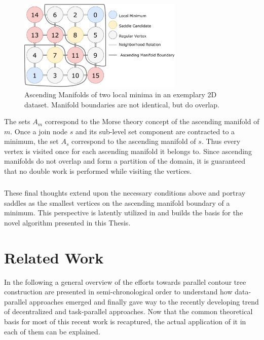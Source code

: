 \documentclass[%
	paper=A4,					%
	twoside=true,				%
	openright,					%
	parskip=full,				%
	chapterprefix=true,			%
	11pt,						%
	headings=normal,			%
	bibliography=totoc,			%
	listof=totoc,				%
	titlepage=on,				%
	captions=tableabove,		%
	draft=false,				%
]{scrreprt}%
\begin{document}
\begin{figure}[h!]
\centering
\includegraphics[width=0.7\textwidth]{figures/AscendingManifold.pdf}
\caption{Ascending Manifolds of two local minima in an exemplary 2D dataset. Manifold boundaries are not identical, but do overlap.}
\label{fig:am}
\end{figure}
  
The sets \(A_m\) correspond to the Morse theory concept of the ascending manifold of \(m\). Once a join node \(s\) and its sub-level set component are contracted to a minimum, the set \(A_s\) correspond to the ascending manifold of \(s\). Thus every vertex is visited once for each ascending manifold it belongs to. Since ascending manifolds do not overlap and form a partition of the domain, it is guaranteed that no double work is performed while visiting the vertices.

\paragraph{}
These final thoughts extend upon the necessary conditions above and portray saddles as the smallest vertices on the ascending manifold boundary of a minimum. This perspective is latently utilized in \cite{Carr} and builds the basis for the novel algorithm presented in this Thesis.

\chapter{Related Work}
In the following a general overview of the efforts towards parallel contour tree construction are presented in semi-chronological order to understand how data-parallel approaches emerged and finally gave way to the recently developing trend of decentralized and task-parallel approaches. Now that the common theoretical basis for most of this recent work is recaptured, the actual application of it in each of them can be explained.
\end{document}
